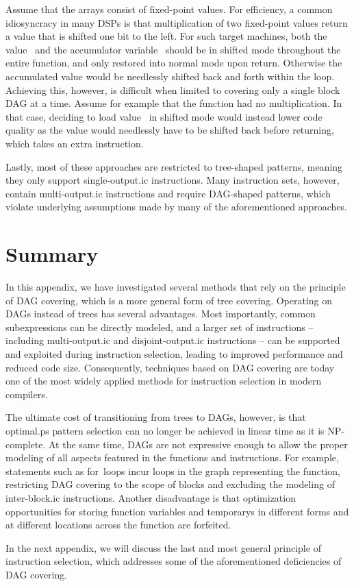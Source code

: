 %
Assume that the arrays consist of fixed-point values.
%
For efficiency, a common idiosyncracy in many \glspl{DSP} is that multiplication
of two fixed-point values return a value that is shifted one bit to the left.
%
For such \glspl{target machine}, both the value~ and the accumulator
\gls{variable}~ should be in shifted mode throughout the entire
\gls{function}, and only restored into normal mode upon return.
%
Otherwise the accumulated value would be needlessly shifted back and forth
within the loop.
%
Achieving this, however, is difficult when limited to covering only a single
\gls{block DAG} at a time.
%
Assume for example that the function had no multiplication.
%
In that case, deciding to load value~ in shifted mode would instead
lower code quality as the value would needlessly have to be shifted back before
returning, which takes an extra \gls{instruction}.

Lastly, most of these approaches are restricted to tree-shaped \glspl{pattern},
meaning they only support \gls{single-output.ic} \glspl{instruction}.
%
Many \glspl{instruction set}, however, contain \gls{multi-output.ic}
\glspl{instruction} and require \gls{DAG}-shaped \glspl{pattern}, which violate
underlying assumptions made by many of the aforementioned approaches.


\section{Summary}

In this appendix, we have investigated several methods that rely on the
\gls{principle} of \gls{DAG covering}, which is a more general form of \gls{tree
  covering}.
%
Operating on \glspl{DAG} instead of \glspl{tree} has several advantages.
%
Most importantly, common subexpressions can be directly modeled, and a larger
set of \glspl{instruction} -- including \gls{multi-output.ic} and
\gls{disjoint-output.ic} \glspl{instruction} -- can be supported and exploited
during \gls{instruction selection}, leading to improved performance and reduced
code size.
%
Consequently, techniques based on \gls{DAG covering} are today one of the most
widely applied methods for \gls{instruction selection} in modern
\glspl{compiler}.

The ultimate cost of transitioning from \glspl{tree} to \glspl{DAG}, however, is
that \gls{optimal.ps} \gls{pattern selection} can no longer be achieved in
linear time as it is NP-complete.
%
At the same time, \glspl{DAG} are not expressive enough to allow the proper
modeling of all aspects featured in the \glspl{function} and
\glspl{instruction}.
%
For example, statements such as \mbox{for loops} incur \glspl{loop} in the
\gls{graph} representing the \gls{function}, restricting \gls{DAG covering} to
the scope of \glspl{block} and excluding the modeling of \gls{inter-block.ic}
\glspl{instruction}.
%
Another disadvantage is that optimization opportunities for storing
\gls{function} variables and \glspl{temporary} in different forms and at
different locations across the \gls{function} are forfeited.

In the next appendix, we will discuss the last and most general \gls{principle}
of \gls{instruction selection}, which addresses some of the aforementioned
deficiencies of \gls{DAG covering}.
